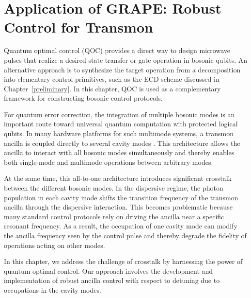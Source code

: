 \chapter{Application of GRAPE: Robust Control for Transmon}
\label{chap:robust}

Quantum optimal control (QOC) provides a direct way to design microwave pulses that realize a desired state transfer or gate operation in bosonic qubits. An alternative approach is to synthesize the target operation from a decomposition into elementary control primitives, such as the ECD scheme discussed in Chapter~\ref{preliminary}. In this chapter, QOC is used as a complementary framework for constructing bosonic control protocols.

For quantum error correction, the integration of multiple bosonic modes is an important route toward universal quantum computation with protected logical qubits. In many hardware platforms for such multimode systems, a transmon ancilla is coupled directly to several cavity modes \cite{naik2017alltoone,chakram2021alltoone,chakram2022alltoone,reineri2023alltoone}. This architecture allows the ancilla to interact with all bosonic modes simultaneously and thereby enables both single-mode and multimode operations between arbitrary modes.

At the same time, this all-to-one architecture introduces significant crosstalk between the different bosonic modes. In the dispersive regime, the photon population in each cavity mode shifts the transition frequency of the transmon ancilla through the dispersive interaction. This becomes problematic because many standard control protocols rely on driving the ancilla near a specific resonant frequency. As a result, the occupation of one cavity mode can modify the ancilla frequency seen by the control pulse and thereby degrade the fidelity of operations acting on other modes.

In this chapter, we address the challenge of crosstalk by harnessing the power
of quantum optimal control. Our approach involves the development and implementation of robust ancilla control with respect to detuning due to occupations in the cavity modes.

